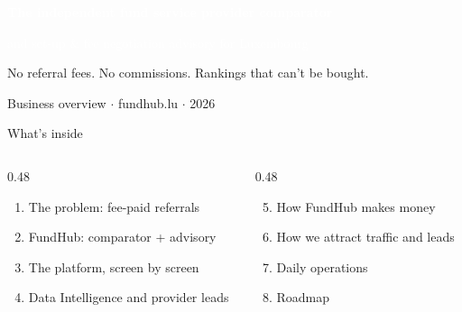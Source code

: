\documentclass[aspectratio=169,10pt]{beamer}
\begin{document}
{
\begin{frame}[plain]
  \vfill
  {\fontsize{60}{60}\selectfont\fundhublight}\par\vspace{6mm}
  {\Large\bfseries\textcolor{white}{The independent fund service provider comparator}}\par\vspace{1mm}
  {\Large\textcolor{white}{and set-up \& fee negotiation advisory for Luxembourg}}\par\vspace{6mm}
  {\normalsize\textcolor{fhEmerald}{No referral fees. No commissions. Rankings that can't be bought.}}\par
  \vfill
  {\scriptsize\textcolor{fhLine}{Business overview $\cdot$ fundhub.lu $\cdot$ 2026}}
\end{frame}}

\begin{frame}{What's inside}
  \begin{columns}[T]
    \begin{column}{0.48\textwidth}
      \begin{enumerate}
        \item The problem: fee-paid referrals
        \item FundHub: comparator + advisory
        \item The platform, screen by screen
        \item Data Intelligence and provider leads
      \end{enumerate}
    \end{column}
    \begin{column}{0.48\textwidth}
      \begin{enumerate}\setcounter{enumi}{4}
        \item How FundHub makes money
        \item How we attract traffic and leads
        \item Daily operations
        \item Roadmap
      \end{enumerate}
    \end{column}
  \end{columns}
\end{frame}
\end{document}
